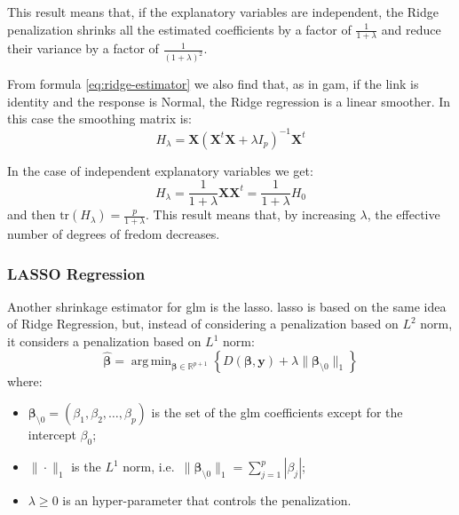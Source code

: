 \documentclass[a4paper, twoside, openright, 12pt]{report}
\providecommand{\tightlist}{%
  \setlength{\itemsep}{0pt}\setlength{\parskip}{0pt}}
\DeclareMathOperator*{\argmin}{arg\,min}  %
\theoremstyle{definition}
\theoremstyle{definition}
\theoremstyle{definition}
\theoremstyle{remark}
\begin{document}
This result means that, if the explanatory variables are independent, the Ridge penalization shrinks all the estimated coefficients by a factor of \(\frac{1}{1+\lambda}\) and reduce their variance by a factor of \(\frac{1}{\left(1+\lambda\right)^2}\).

From formula \eqref{eq:ridge-estimator} we also find that, as in \ac{gam}, if the link is identity and the response is Normal, the Ridge regression is a linear smoother. In this case the smoothing matrix is:
\[
H_{\lambda} = \boldsymbol{X} \left(\boldsymbol{X}^t\boldsymbol{X}+\lambda I_p\right)^{-1}\boldsymbol{X}^t
\]

In the case of independent explanatory variables we get:
\[
H_{\lambda} = \frac{1}{1+\lambda} \boldsymbol{X} \boldsymbol{X}^t = \frac{1}{1+\lambda} H_0
\]
and then \(\text{tr}\left(H_{\lambda}\right) = \frac{p}{1+\lambda}\). This result means that, by increasing \(\lambda\), the effective number of degrees of fredom decreases.

\hypertarget{lasso-regression}{%
\subsubsection{LASSO Regression}\label{lasso-regression}}

Another shrinkage estimator for \ac{glm} is the \ac{lasso}. \ac{lasso} is based on the same idea of Ridge Regression, but, instead of considering a penalization based on \(L^2\) norm, it considers a penalization based on \(L^1\) norm:
\begin{equation}
\label{eq:lasso-est-deviance}
\hat{\boldsymbol{\beta}} = \argmin_{\boldsymbol{\beta}\in\mathbb{R}^{p+1}}{\left\{D(\boldsymbol{\beta}, \boldsymbol{y}) + \lambda \|\boldsymbol{\beta}_{\setminus0}\|_1\right\}}
\end{equation}
where:

\begin{itemize}
\tightlist
\item
  \(\boldsymbol{\beta}_{\setminus0} = \left(\beta_1, \beta_2, \dots, \beta_p\right)\) is the set of the \ac{glm} coefficients except for the intercept \(\beta_0\);
\item
  \(\|\cdot\|_1\) is the \(L^1\) norm, i.e.~\(\|\boldsymbol{\beta}_{\setminus0}\|_1 = \sum_{j=1}^p{|\beta_j|}\);
\item
  \(\lambda\ge0\) is an hyper-parameter that controls the penalization.
\end{itemize}
\end{document}
